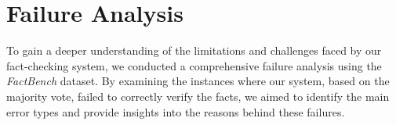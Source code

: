 \begin{table}
    \noindent
    \caption{Evaluation Results for Different Methods through the Pipeline (just with the Gemma2 model)}
    \label{tab:evaluation_results-kossher3}
\end{table}


\section{Failure Analysis}\label{sec:faiure-analysis}
To gain a deeper understanding of the limitations and challenges faced by our fact-checking system, we conducted a comprehensive failure analysis using the \textit{FactBench} dataset.
By examining the instances where our system, based on the majority vote, failed to correctly verify the facts, we aimed to identify the main error types and provide insights into the reasons behind these failures.
